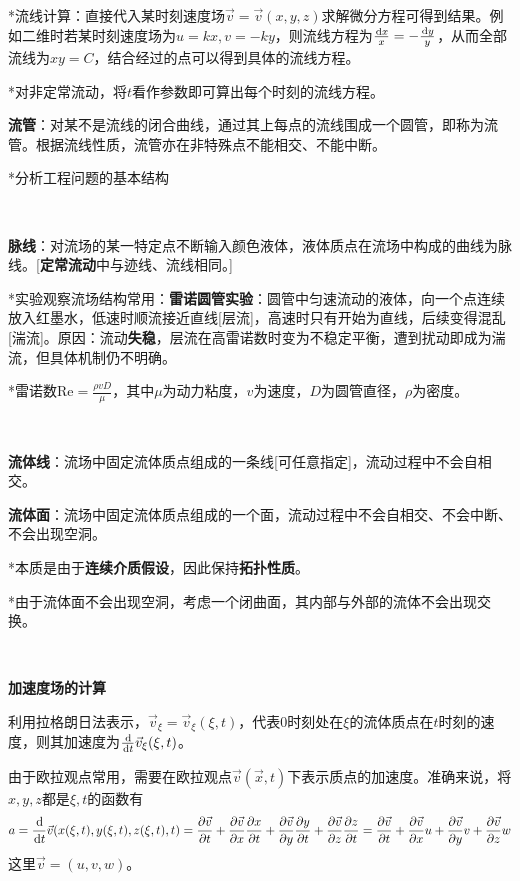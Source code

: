 \documentclass[a4paper,UTF8,fontset=windows]{ctexart}
\newcommand*{\dr}{\hspace{0.07em}\mathrm{d}}
\begin{document}
*流线计算：直接代入某时刻速度场$\vec{v}=\vec{v}(x,y,z)$求解微分方程可得到结果。例如二维时若某时刻速度场为$u=kx,v=-ky$，则流线方程为$\frac{\dr x}{x}=-\frac{\dr y}{y}$，从而全部流线为$xy=C$，结合经过的点可以得到具体的流线方程。

*对非定常流动，将$t$看作参数即可算出每个时刻的流线方程。

\textbf{流管}：对某不是流线的闭合曲线，通过其上每点的流线围成一个圆管，即称为流管。根据流线性质，流管亦在非特殊点不能相交、不能中断。

*分析工程问题的基本结构

\

\textbf{脉线}：对流场的某一特定点不断输入颜色液体，液体质点在流场中构成的曲线为脉线。[\textbf{定常流动}中与迹线、流线相同。]

*实验观察流场结构常用：\textbf{雷诺圆管实验}：圆管中匀速流动的液体，向一个点连续放入红墨水，低速时顺流接近直线[层流]，高速时只有开始为直线，后续变得混乱[湍流]。原因：流动\textbf{失稳}，层流在高雷诺数时变为不稳定平衡，遭到扰动即成为湍流，但具体机制仍不明确。

*雷诺数$\mathrm{Re}=\frac{\rho vD}{\mu}$，其中$\mu$为动力粘度，$v$为速度，$D$为圆管直径，$\rho$为密度。

\

\textbf{流体线}：流场中固定流体质点组成的一条线[可任意指定]，流动过程中不会自相交。

\textbf{流体面}：流场中固定流体质点组成的一个面，流动过程中不会自相交、不会中断、不会出现空洞。

*本质是由于\textbf{连续介质假设}，因此保持\textbf{拓扑性质}。

*由于流体面不会出现空洞，考虑一个闭曲面，其内部与外部的流体不会出现交换。

\

\textbf{加速度场的计算}

利用拉格朗日法表示，$\vec{v}_\xi=\vec{v}_\xi(\xi,t)$，代表0时刻处在$\xi$的流体质点在$t$时刻的速度，则其加速度为$\frac{\dr}{\dr t}\vec{v}_\xi(\xi,t)$。

由于欧拉观点常用，需要在欧拉观点$\vec{v}(\vec{x},t)$下表示质点的加速度。准确来说，将$x,y,z$都是$\xi,t$的函数有
$$a=\frac{\dr}{\dr t}\vec{v}(x(\xi,t),y(\xi,t),z(\xi,t),t)=\frac{\partial \vec{v}}{\partial t}+\frac{\partial \vec{v}}{\partial x}\frac{\partial x}{\partial t}+\frac{\partial \vec{v}}{\partial y}\frac{\partial y}{\partial t}+\frac{\partial \vec{v}}{\partial z}\frac{\partial z}{\partial t}=\frac{\partial \vec{v}}{\partial t}+\frac{\partial \vec{v}}{\partial x}u+\frac{\partial \vec{v}}{\partial y}v+\frac{\partial \vec{v}}{\partial z}w$$
这里$\vec{v}=(u,v,w)$。
\end{document}
